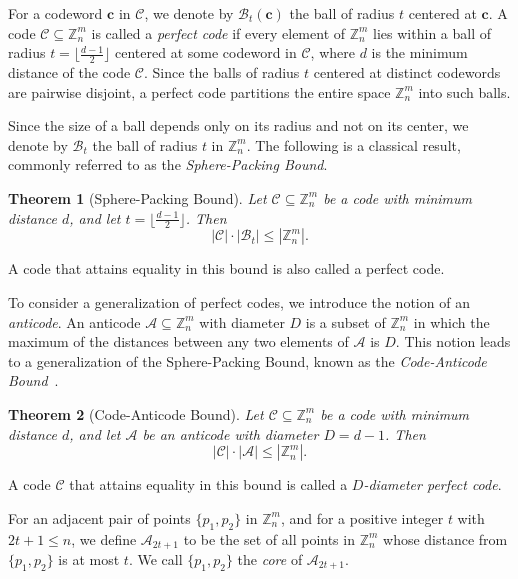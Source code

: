 \documentclass{article}
\newtheorem{theorem}{Theorem}[section]
\theoremstyle{definition}
\begin{document}
For a codeword $\mathbf{c}$ in $\mathcal{C}$, we denote by $\mathcal{B}_t(\mathbf{c})$ the ball of radius $t$ centered at $\mathbf{c}$. A code $\mathcal{C}\subseteq\mathbb{Z}_n^m$ is called a \textit{perfect code} if every element of $\mathbb{Z}_n^m$ lies within a ball of radius $t=\lfloor\frac{d-1}{2}\rfloor$ centered at some codeword in $\mathcal{C}$, where $d$ is the minimum distance of the code $\mathcal{C}$. Since the balls of radius $t$ centered at distinct codewords are pairwise disjoint, a perfect code partitions the entire space $\mathbb{Z}_n^m$ into such balls.

Since the size of a ball depends only on its radius and not on its center, we denote by $\mathcal{B}_t$ the ball of radius $t$ in $\mathbb{Z}_n^m$. The following is a classical result, commonly referred to as the \textit{Sphere-Packing Bound}.

\begin{theorem}[Sphere-Packing Bound]
Let $\mathcal{C}\subseteq \mathbb{Z}_n^m$ be a code with minimum distance $d$, and let $t=\lfloor\frac{d-1}{2}\rfloor$. Then
\[
|\mathcal{C}|\cdot|\mathcal{B}_t|\le |\mathbb{Z}_n^m|.
\]
\end{theorem}
A code that attains equality in this bound is also called a perfect code.

To consider a generalization of perfect codes, we introduce the notion of an \textit{anticode}. An anticode $\mathcal{A}\subseteq \mathbb{Z}_n^m$ with diameter $D$ is a subset of $\mathbb{Z}_n^m$ in which the maximum of the distances between any two elements of $\mathcal{A}$ is $D$. This notion leads to a generalization of the Sphere-Packing Bound, known as the \textit{Code-Anticode Bound}~\cite{D73}.
\begin{theorem}[Code-Anticode Bound]\label{cabound}
	Let $\mathcal{C}\subseteq\mathbb{Z}_n^m$ be a code with minimum distance $d$, and let $\mathcal{A}$ be an anticode with diameter $D=d-1$. Then
	\[
	|\mathcal{C}|\cdot |\mathcal{A}|\le |\mathbb{Z}_n^m|.
	\]
\end{theorem}
A code $\mathcal{C}$ that attains equality in this bound is called a \textit{$D$-diameter perfect code}.

For an adjacent pair of points $\{p_1, p_2\}$ in $\mathbb{Z}_n^m$, and for a positive integer $t$ with $2t+1\le n$, we define $\mathcal{A}_{2t+1}$ to be the set of all points in $\mathbb{Z}_n^m$ whose distance from $\{p_1, p_2\}$ is at most $t$. We call $\{p_1, p_2\}$ the \textit{core} of $\mathcal{A}_{2t+1}$.
\end{document}
